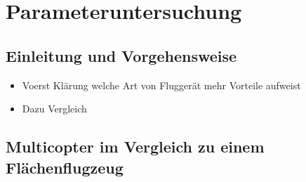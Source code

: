 \chapter{Parameteruntersuchung}
\label{chap:parameteruntersuchung}

\section{Einleitung und Vorgehensweise}
\label{sec:einleitung_und_vorgehensweise}
\begin{itemize}
 	\item Voerst Klärung welche Art von Fluggerät mehr Vorteile aufweist
 	\item Dazu Vergleich 
\end{itemize}

\section{Multicopter im Vergleich zu einem Flächenflugzeug}
\label{sec:multicopter_vs_flaechenflugzeug}


